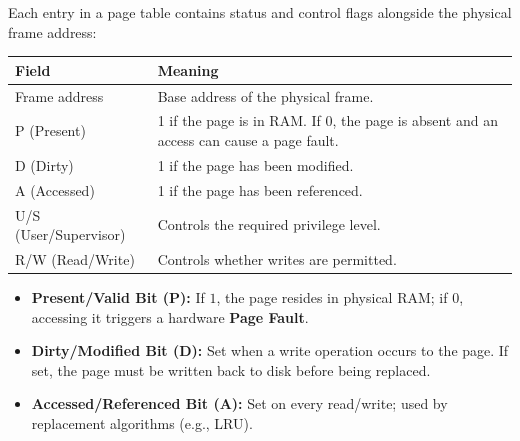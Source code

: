 \documentclass[12pt,a4paper]{article}
\begin{document}
\begin{tcolorbox}[formulabox, title={Page Table Entry (PTE) Architecture}]
Each entry in a page table contains status and control flags alongside the physical frame address:
\par\vspace{4pt}
\centering
\begin{tabularx}{\linewidth}{|B{3.25cm}|Y|}
\hline
\textbf{Field} & \textbf{Meaning} \\ \hline
Frame address & Base address of the physical frame. \\ \hline
P (Present) & 1 if the page is in RAM. If 0, the page is absent and an access can cause a page fault. \\ \hline
D (Dirty) & 1 if the page has been modified. \\ \hline
A (Accessed) & 1 if the page has been referenced. \\ \hline
U/S (User/Supervisor) & Controls the required privilege level. \\ \hline
R/W (Read/Write) & Controls whether writes are permitted. \\ \hline
\end{tabularx}
\par\vspace{4pt}\raggedright
\begin{itemize}[leftmargin=*, itemsep=2pt]
  \item \textbf{Present/Valid Bit (P):} If $1$, the page resides in physical RAM; if $0$, accessing it triggers a hardware \textbf{Page Fault}.
  \item \textbf{Dirty/Modified Bit (D):} Set when a write operation occurs to the page. If set, the page must be written back to disk before being replaced.
  \item \textbf{Accessed/Referenced Bit (A):} Set on every read/write; used by replacement algorithms (e.g., LRU).
\end{itemize}
\end{tcolorbox}
\end{document}
